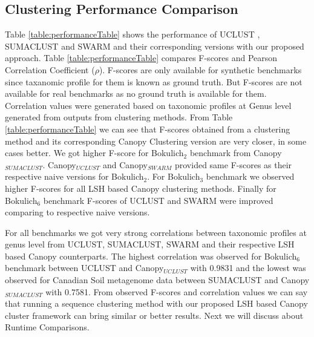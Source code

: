 \documentclass[10pt, conference, compsocconf]{IEEEtran}
\begin{document}
\subsection{\textbf{Clustering Performance Comparison}}
Table \ref{table:performanceTable} shows the performance of  UCLUST \cite{MARuclust}, 
SUMACLUST \cite{MARSumaclust} and SWARM \cite{MARSwarm} and their corresponding versions with our proposed approach. Table \ref{table:performanceTable} compares F-scores and Pearson Correlation Coefficient ($\rho$). F-scores are only available for synthetic benchmarks since taxanomic profile for them is known as ground truth. But F-scores are not available for real benchmarks as no ground truth is available for them. Correlation values were generated based on taxonomic profiles at Genus level generated from outputs from clustering methods. From Table \ref{table:performanceTable} we can see that F-scores obtained from a clustering method and its corresponding Canopy Clustering version are very closer, in some cases better. We got higher F-score for Bokulich$_2$ benchmark from Canopy$_{SUMACLUST}$. Canopy$_{UCLUST}$ and Canopy$_{SWARM}$ provided same F-scores as their respective naive versions for Bokulich$_2$. For Bokulich$_3$ benchmark we observed higher F-scores for all LSH based Canopy clustering methods. Finally for Bokulich$_6$ benchmark F-scores of UCLUST and SWARM were improved comparing to respective naive versions.

For all benchmarks we got very strong correlations between taxonomic profiles at genus level from UCLUST, SUMACLUST, SWARM and their respective LSH based Canopy counterparts. The highest correlation was observed for Bokulich$_6$ benchmark between UCLUST and Canopy$_{UCLUST}$ with 0.9831 and the lowest was observed for Canadian Soil metagenome data between SUMACLUST and Canopy$_{SUMACLUST}$ with 0.7581. From observed F-scores and correlation values we can say that running a sequence clustering method with our proposed LSH based Canopy cluster framework can bring similar or better results. Next we will discuss about Runtime Comparisons.
\end{document}
